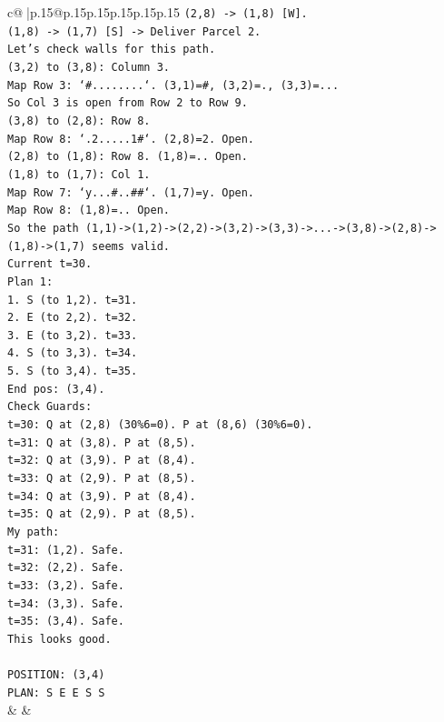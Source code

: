 \documentclass{article}
\begin{document}
{\begin{supertabular}{c@{$\;$}|p{.15\linewidth}@{}p{.15\linewidth}p{.15\linewidth}p{.15\linewidth}p{.15\linewidth}p{.15\linewidth}}
{{{\texttt{(2,8) {-}> (1,8) {[}W{]}.} \\
\texttt{(1,8) {-}> (1,7) {[}S{]} {-}> Deliver Parcel 2.} \\
\texttt{Let's check walls for this path.} \\
\texttt{(3,2) to (3,8): Column 3.} \\
\texttt{Map Row 3: `\#........`. (3,1)=\#, (3,2)=., (3,3)=...} \\
\texttt{So Col 3 is open from Row 2 to Row 9.} \\
\texttt{(3,8) to (2,8): Row 8.} \\
\texttt{Map Row 8: `.2.....1\#`. (2,8)=2. Open.} \\
\texttt{(2,8) to (1,8): Row 8. (1,8)=.. Open.} \\
\texttt{(1,8) to (1,7): Col 1.} \\
\texttt{Map Row 7: `y...\#..\#\#`. (1,7)=y. Open.} \\
\texttt{Map Row 8: (1,8)=.. Open.} \\
\texttt{So the path (1,1){-}>(1,2){-}>(2,2){-}>(3,2){-}>(3,3){-}>...{-}>(3,8){-}>(2,8){-}>(1,8){-}>(1,7) seems valid.} \\
\texttt{Current t=30.} \\
\texttt{Plan 1:} \\
\texttt{1. S (to 1,2). t=31.} \\
\texttt{2. E (to 2,2). t=32.} \\
\texttt{3. E (to 3,2). t=33.} \\
\texttt{4. S (to 3,3). t=34.} \\
\texttt{5. S (to 3,4). t=35.} \\
\texttt{End pos: (3,4).} \\
\texttt{Check Guards:} \\
\texttt{t=30: Q at (2,8) (30\%6=0). P at (8,6) (30\%6=0).} \\
\texttt{t=31: Q at (3,8). P at (8,5).} \\
\texttt{t=32: Q at (3,9). P at (8,4).} \\
\texttt{t=33: Q at (2,9). P at (8,5).} \\
\texttt{t=34: Q at (3,9). P at (8,4).} \\
\texttt{t=35: Q at (2,9). P at (8,5).} \\
\texttt{My path:} \\
\texttt{t=31: (1,2). Safe.} \\
\texttt{t=32: (2,2). Safe.} \\
\texttt{t=33: (3,2). Safe.} \\
\texttt{t=34: (3,3). Safe.} \\
\texttt{t=35: (3,4). Safe.} \\
\texttt{This looks good.} \\
\\ 
\texttt{POSITION: (3,4)} \\
\texttt{PLAN: S E E S S} \\
            }
        }
    }
    & & \\ \\


\end{supertabular}}
\end{document}
